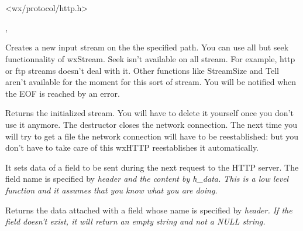 \section{}\label{wxhttp}




<wx/protocol/http.h>


, 


\label{wxprotogetinput}


Creates a new input stream on the the specified path. You can use all but seek
functionnality of wxStream. Seek isn't available on all stream. For example,
http or ftp streams doesn't deal with it. Other functions like StreamSize and
Tell aren't available for the moment for this sort of stream.
You will be notified when the EOF is reached by an error.


Returns the initialized stream. You will have to delete it yourself once you
don't use it anymore. The destructor closes the network connection.
The next time you will try to get a file the network connection will have
to be reestablished: but you don't have to take care of this wxHTTP reestablishes it automatically.






It sets data of a field to be sent during the next request to the HTTP server. The field
name is specified by \it{header} and the content by \it{h_data}.
This is a low level function and it assumes that you know what you are doing.


Returns the data attached with a field whose name is specified by \it{header}.
If the field doesn't exist, it will return an empty string and not a NULL string.
